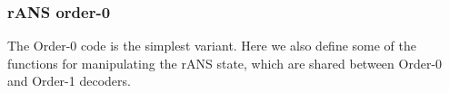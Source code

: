 \documentclass[a4paper]{article}
\begin{document}
\vskip 0.5cm

\begin{algorithmic}[1]
\settowidth{\maxwidth}{$n\_out$}
\State {} 
\State {} 
\State {} 
\State {}
  \State {}
\Else
  \State {}
\EndIf
\EndProcedure
\end{algorithmic}


\subsubsection*{rANS order-0}

The Order-0 code is the simplest variant.
Here we also define some of the functions for manipulating the rANS state, which are shared between Order-0 and Order-1 decoders.

\vskip 0.5cm
\end{document}
